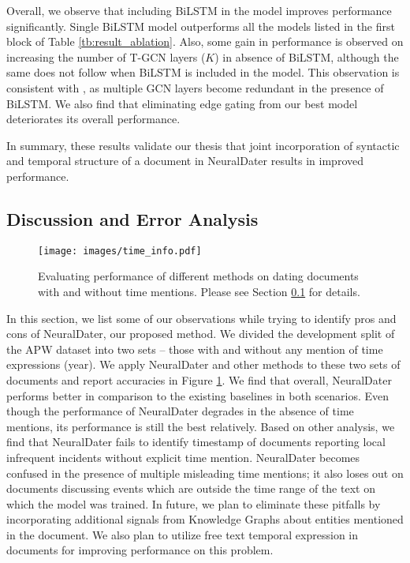 \documentclass[11pt,a4paper]{article}
\newcommand{\reffig}[1]{Figure \ref{#1}}
\newcommand{\reftbl}[1]{Table \ref{#1}}
\newcommand{\refsec}[1]{Section \ref{#1}}
\newcommand{\method}{NeuralDater}
\begin{document}
Overall, we observe that including BiLSTM in the model improves performance significantly. Single BiLSTM model outperforms all the models listed in the first block of  \reftbl{tb:result_ablation}. Also, some gain in performance is observed on increasing the number of T-GCN layers ($K$) in absence of BiLSTM, although the same does not follow when BiLSTM is included in the model. This observation is consistent with \cite{gcn_srl}, as multiple GCN layers become redundant in the presence of BiLSTM. We also find that eliminating edge gating from our best model deteriorates its overall performance.

In summary, these results validate our thesis that joint incorporation of syntactic and temporal structure of a document in \method{} results in improved performance.

\subsection{Discussion and Error Analysis}
\label{sec:discussion}

\begin{figure}[t]
	\centering
	\texttt{[image: images/time\_info.pdf]}
	\caption{\label{fig:results_time_mention}Evaluating performance of different methods on dating  documents with and without time mentions. Please see \refsec{sec:discussion} for details.}
\end{figure}

In this section, we list some of our observations while trying to identify pros and cons of \method{}, our proposed method. We divided the development split of the APW dataset into two sets -- those with and without any mention of time expressions (year). We apply \method{} and other methods to these two sets of documents and report accuracies in \reffig{fig:results_time_mention}. We find that overall, \method{} performs better in comparison to the existing baselines in both scenarios. Even though the performance of \method{} degrades in the absence of time mentions, its performance is still the best relatively. Based on other analysis, we find that \method{} fails to identify timestamp of documents reporting local infrequent incidents without explicit time mention. \method{} becomes confused in the presence of multiple misleading time mentions; it also loses out on documents discussing events which are outside the time range of the text on which the model was trained. In future, we plan to eliminate these pitfalls by incorporating additional signals from Knowledge Graphs about entities mentioned in the document. We also plan to utilize free text temporal expression \cite{temponym_paper} in documents for improving performance on this problem. 
\end{document}
